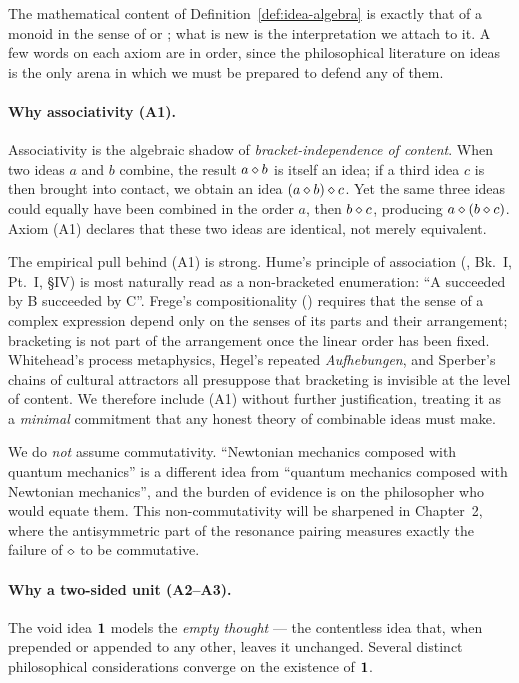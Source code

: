 The mathematical content of Definition~\ref{def:idea-algebra} is exactly that
of a monoid in the sense of \cite{MacLane1998} or \cite{Bourbaki1989}; what
is new is the interpretation we attach to it.  A few words on each axiom
are in order, since the philosophical literature on ideas is the only
arena in which we must be prepared to defend any of them.

\paragraph{Why associativity (A1).}
Associativity is the algebraic shadow of \emph{bracket-independence of
content}.  When two ideas $a$ and $b$ combine, the result $a \mathbin{\diamond} b$ is
itself an idea; if a third idea $c$ is then brought into contact, we obtain
an idea $(a \mathbin{\diamond} b) \mathbin{\diamond} c$.  Yet the same three ideas could
equally have been combined in the order $a$, then $b \mathbin{\diamond} c$,
producing $a \mathbin{\diamond} (b \mathbin{\diamond} c)$.  Axiom (A1) declares that these two
ideas are identical, not merely equivalent.

The empirical pull behind (A1) is strong.  Hume's principle of
association (\cite{Hume1739}, Bk.~I, Pt.~I, \S IV) is most naturally read
as a non-bracketed enumeration: ``A succeeded by B succeeded by C''.
Frege's compositionality (\cite{Frege1892}) requires that the sense of a
complex expression depend only on the senses of its parts and their
arrangement; bracketing is not part of the arrangement once the linear
order has been fixed.  Whitehead's process metaphysics, Hegel's repeated
\emph{Aufhebungen}, and Sperber's chains of cultural attractors all
presuppose that bracketing is invisible at the level of content.  We
therefore include (A1) without further justification, treating it as a
\emph{minimal} commitment that any honest theory of combinable ideas must
make.

We do \emph{not} assume commutativity.  ``Newtonian mechanics composed
with quantum mechanics'' is a different idea from ``quantum mechanics
composed with Newtonian mechanics'', and the burden of evidence is on the
philosopher who would equate them.  This non-commutativity will be
sharpened in Chapter~2, where the antisymmetric part of the resonance
pairing measures exactly the failure of $\mathbin{\diamond}$ to be commutative.

\paragraph{Why a two-sided unit (A2--A3).}
The void idea $\mathbf{1}$ models the \emph{empty thought} --- the contentless
idea that, when prepended or appended to any other, leaves it unchanged.
Several distinct philosophical considerations converge on the existence of
$\mathbf{1}$.

